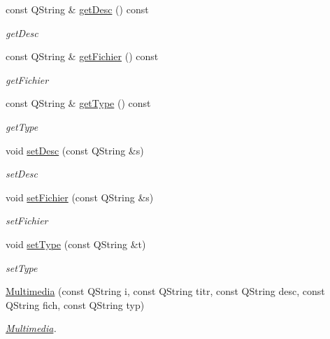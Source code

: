 \begin{DoxyCompactItemize}
\item 
const Q\+String \& \hyperlink{class_multimedia_a5036bb76fb0e9e0fc30fab727c2153bf}{get\+Desc} () const
\begin{DoxyCompactList}\small\item\em get\+Desc \end{DoxyCompactList}\item 
const Q\+String \& \hyperlink{class_multimedia_af104383032e12ecd6b4e44fefc6dd6b8}{get\+Fichier} () const
\begin{DoxyCompactList}\small\item\em get\+Fichier \end{DoxyCompactList}\item 
const Q\+String \& \hyperlink{class_multimedia_a2efca50fca32401a47da0438fc063cbf}{get\+Type} () const
\begin{DoxyCompactList}\small\item\em get\+Type \end{DoxyCompactList}\item 
void \hyperlink{class_multimedia_a69eeb6cd2fa096efd99193e2e2427765}{set\+Desc} (const Q\+String \&s)
\begin{DoxyCompactList}\small\item\em set\+Desc \end{DoxyCompactList}\item 
void \hyperlink{class_multimedia_a09e44004cbaa54f55b933cbdda12cb49}{set\+Fichier} (const Q\+String \&s)
\begin{DoxyCompactList}\small\item\em set\+Fichier \end{DoxyCompactList}\item 
void \hyperlink{class_multimedia_a1e0b015d47c6bbe7704f78d6b2470ecf}{set\+Type} (const Q\+String \&t)
\begin{DoxyCompactList}\small\item\em set\+Type \end{DoxyCompactList}\item 
\hyperlink{class_multimedia_ace2a9de6115c4d35f08468ed29af8a04}{Multimedia} (const Q\+String i, const Q\+String titr, const Q\+String desc, const Q\+String fich, const Q\+String typ)
\begin{DoxyCompactList}\small\item\em \hyperlink{class_multimedia}{Multimedia}. \end{DoxyCompactList}\item 

\end{DoxyCompactItemize}
